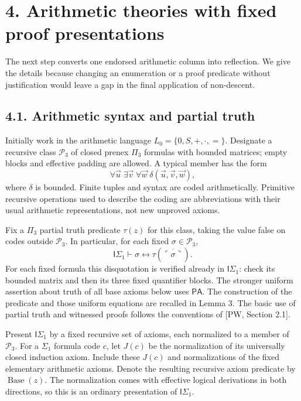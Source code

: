 \documentclass[
  11pt,
  letterpaper,
]{article}
\begin{document}
\section{4. Arithmetic theories with fixed proof
presentations}\label{arithmetic-theories-with-fixed-proof-presentations}

The next step converts one endorsed arithmetic column into reflection.
We give the details because changing an enumeration or a proof predicate
without justification would leave a gap in the final application of
non-descent.

\subsection{4.1. Arithmetic syntax and partial
truth}\label{arithmetic-syntax-and-partial-truth}

Initially work in the arithmetic language \(L_0=\{0,S,+,\cdot,=\}\).
Designate a recursive class \(\mathcal P_3\) of closed prenex \(\Pi_3\)
formulas with bounded matrices; empty blocks and effective padding are
allowed. A typical member has the form \[
\forall\vec u\;\exists\vec v\;\forall\vec w\;
\delta(\vec u,\vec v,\vec w),
\] where \(\delta\) is bounded. Finite tuples and syntax are coded
arithmetically. Primitive recursive operations used to describe the
coding are abbreviations with their usual arithmetic representations,
not new unproved axioms.

Fix a \(\Pi_3\) partial truth predicate \(\tau(z)\) for this class,
taking the value false on codes outside \(\mathcal P_3\). In particular,
for each fixed \(\sigma\in\mathcal P_3\), \[
\mathsf I\Sigma_1\vdash
\sigma\leftrightarrow\tau(\overline{\ulcorner\sigma\urcorner}).
\tag{11}
\] For each fixed formula this disquotation is verified already in
\(\mathsf I\Sigma_1\): check its bounded matrix and then its three fixed
quantifier blocks. The stronger uniform assertion about truth of all
base axioms below uses \(\mathsf{PA}\). The construction of the
predicate and those uniform equations are recalled in Lemma 3. The basic
use of partial truth and witnessed proofs follows the conventions of
{[}PW, Section 2.1{]}.

Present \(\mathsf I\Sigma_1\) by a fixed recursive set of axioms, each
normalized to a member of \(\mathcal P_3\). For a \(\Sigma_1\) formula
code \(c\), let \(J(c)\) be the normalization of its universally closed
induction axiom. Include these \(J(c)\) and normalizations of the fixed
elementary arithmetic axioms. Denote the resulting recursive axiom
predicate by \(\operatorname{Base}(z)\). The normalization comes with
effective logical derivations in both directions, so this is an ordinary
presentation of \(\mathsf I\Sigma_1\).
\end{document}

